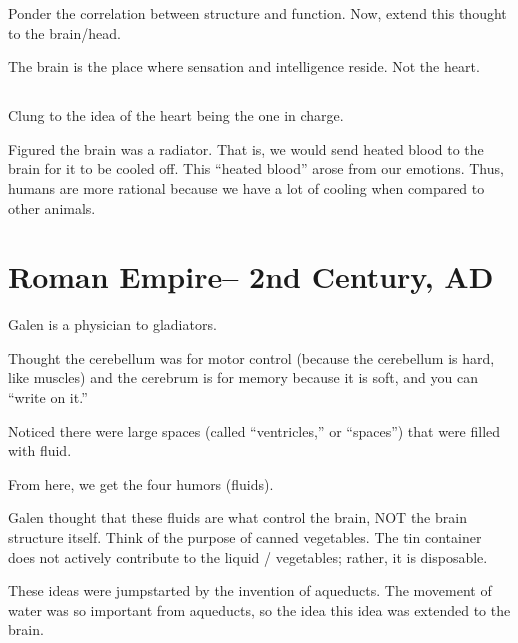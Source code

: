 \begin{coloredlist}
    \item Ponder the correlation between structure and function. Now, extend this thought to the brain/head.
    \item The brain is the place where sensation and intelligence reside. Not the heart.
\end{coloredlist}

\label{person:aristotle}%
\subsection{}

\begin{coloredlist}
    \item Clung to the idea of the heart being the one in charge.
    \item Figured the brain was a radiator. That is, we would send heated blood to the brain for it to be cooled off. This ``heated blood'' arose from our emotions. Thus, humans are more rational because we have a lot of cooling when compared to other animals.
\end{coloredlist}
\label{person:galen}%
\section{Roman Empire-- 2nd Century, AD}

\begin{coloredlist}
    \item Galen is a physician to gladiators.
    \item Thought the cerebellum was for motor control (because the cerebellum is hard, like muscles) and the cerebrum is for memory because it is soft, and you can ``write on it.''
    \item Noticed there were large spaces (called ``ventricles,'' or ``spaces'') that were filled with fluid.
    \item From here, we get the four humors (fluids).
    \item Galen thought that these fluids are what control the brain, NOT the brain structure itself. Think of the purpose of canned vegetables. The tin container does not actively contribute to the liquid / vegetables; rather, it is disposable.
    \item These ideas were jumpstarted by the invention of aqueducts. The movement of water was so important from aqueducts, so the idea this idea was extended to the brain.
\end{coloredlist}

